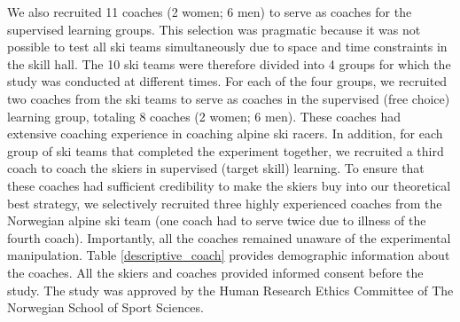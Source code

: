 \documentclass[pdflatex,sn-mathphys-num]{sn-jnl}%
\theoremstyle{thmstyleone}%
\theoremstyle{thmstyletwo}%
\theoremstyle{thmstylethree}%
\begin{document}
We also recruited 11 coaches (2 women; 6 men) to serve as coaches for the supervised learning groups. This selection was pragmatic because it was not possible to test all ski teams simultaneously due to space and time constraints in the skill hall. The 10 ski teams were therefore divided into 4 groups for which the study was conducted at different times. For each of the four groups, we recruited two coaches from the ski teams to serve as coaches in the supervised (free choice) learning group, totaling 8 coaches (2 women; 6 men). These coaches had extensive coaching experience in coaching alpine ski racers. In addition, for each group of ski teams that completed the experiment together, we recruited a third coach to coach the skiers in supervised (target skill) learning. To ensure that these coaches had sufficient credibility to make the skiers buy into our theoretical best strategy, we selectively recruited three highly experienced coaches from the Norwegian alpine ski team (one coach had to serve twice due to illness of the fourth coach). Importantly, all the coaches remained unaware of the experimental manipulation. Table \ref{descriptive_coach} provides demographic information about the coaches. All the skiers and coaches provided informed consent before the study. The study was approved by the Human Research Ethics Committee of The Norwegian School of Sport Sciences.
\end{document}
